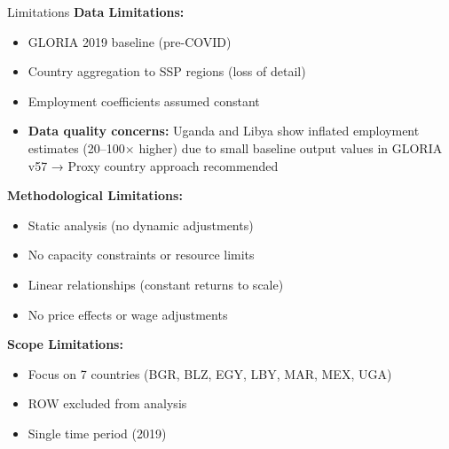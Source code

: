 \documentclass[10pt]{beamer}
\begin{document}

\begin{frame}{Limitations}
\textbf{Data Limitations:}
\begin{itemize}
    \item GLORIA 2019 baseline (pre-COVID)
    \item Country aggregation to SSP regions (loss of detail)
    \item Employment coefficients assumed constant
    \item \textbf{Data quality concerns:} Uganda and Libya show inflated employment estimates (20--100$\times$ higher) due to small baseline output values in GLORIA v57 → Proxy country approach recommended
\end{itemize}

\vspace{0.3cm}

\textbf{Methodological Limitations:}
\begin{itemize}
    \item Static analysis (no dynamic adjustments)
    \item No capacity constraints or resource limits
    \item Linear relationships (constant returns to scale)
    \item No price effects or wage adjustments
\end{itemize}

\vspace{0.3cm}

\textbf{Scope Limitations:}
\begin{itemize}
    \item Focus on 7 countries (BGR, BLZ, EGY, LBY, MAR, MEX, UGA)
    \item ROW excluded from analysis
    \item Single time period (2019)
\end{itemize}
\end{frame}
\end{document}
